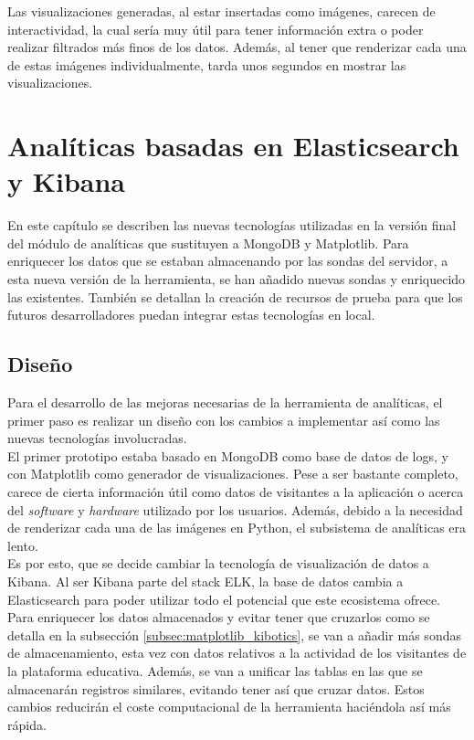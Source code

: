 \documentclass[a4paper, 12pt]{book}
\begin{document}
		Las visualizaciones generadas, al estar insertadas como imágenes, carecen de interactividad, la cual sería muy útil para tener información extra o poder realizar filtrados más finos de los datos. Además, al tener que renderizar cada una de estas imágenes individualmente, tarda unos segundos en mostrar las visualizaciones.
	
	
	\cleardoublepage 
	\chapter{Analíticas basadas en Elasticsearch y Kibana} 
	\label{chap:segundo_prototipo} 
		En este capítulo se describen las nuevas tecnologías utilizadas en la versión final del módulo de analíticas que sustituyen a MongoDB y Matplotlib. Para enriquecer los datos que se estaban almacenando por las sondas del servidor, a esta nueva versión de la herramienta, se han añadido nuevas sondas y enriquecido las existentes. También se detallan la creación de recursos de prueba para que los futuros desarrolladores puedan integrar estas tecnologías en local.
	
	\section{Diseño} 
	\label{sec:2_diseno} 
		Para el desarrollo de las mejoras necesarias de la herramienta de analíticas, el primer paso es realizar un diseño con los cambios a implementar así como las nuevas tecnologías involucradas. \\
		
		El primer prototipo  estaba basado en MongoDB como base de datos de logs, y con Matplotlib como generador de visualizaciones. Pese a ser bastante completo, carece de cierta información útil como datos de visitantes a la aplicación o acerca del \textit{software} y \textit{hardware} utilizado por los usuarios. Además, debido a la necesidad de renderizar cada una de las imágenes en Python, el subsistema de analíticas era lento. \\
		
		Es por esto, que se decide cambiar la tecnología de visualización de datos a Kibana. Al ser Kibana parte del stack ELK, la base de datos cambia a Elasticsearch para poder utilizar todo el potencial que este ecosistema ofrece. \\
		
		Para enriquecer los datos almacenados y evitar tener que cruzarlos como se detalla en la subsección \ref{subsec:matplotlib_kibotics}, se van a añadir más sondas de almacenamiento, esta vez con datos relativos a la actividad de los visitantes de la plataforma educativa. Además, se van a unificar las tablas en las que se almacenarán registros similares, evitando tener así que cruzar datos. Estos cambios reducirán el coste computacional de la herramienta haciéndola así más rápida. \\
		
\end{document}
